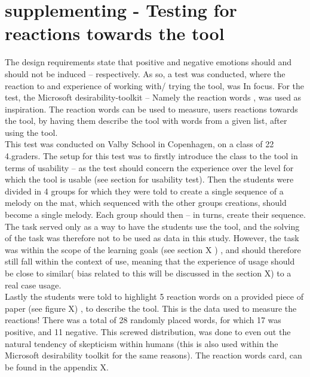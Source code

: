 \section{supplementing - Testing for reactions towards the tool}
The design requirements state that positive and negative emotions should and should not be induced – respectively. As so, a test was conducted, where the reaction to and experience of working with/ trying the tool, was In focus. For the test, the Microsoft desirability-toolkit – Namely the reaction words \cite{reactionWords}, was used as inspiration. The reaction words can be used to measure, users reactions towards the tool, by having them describe the tool with words from a given list, after using the tool. 
\newline
\\
This test was conducted on Valby School in Copenhagen, on a class of 22 4.graders. The setup for this test was to firstly introduce the class to the tool in terms of usability – as the test should concern the experience over the level for which the tool is usable (see section for usability test). Then the students were divided in 4 groups for which they were told to create a single sequence of a melody on the mat, which sequenced with the other groups creations, should become a single melody. Each group should then – in turns, create their sequence. The task served only as a way to have the students use the tool, and the solving of the task was therefore not to be used as data in this study. However, the task was within the scope of the learning goals (see section X ) , and should therefore still fall within the context of use, meaning that the experience of usage should be close to similar( bias related to this will be discussed in the section X) to a real case usage.    
\newline
\\
Lastly the students were told to highlight 5 reaction words on a provided piece of paper (see figure X) , to describe the tool. This is the data used to measure the reactions! There was a total of 28 randomly placed words, for which 17 was positive, and 11 negative. This screwed distribution, was done to even out the natural tendency of skepticism within humans (this is also used within the Microsoft desirability toolkit for the same reasons).  The reaction words card, can be found in the appendix X. 
\newline
\\

